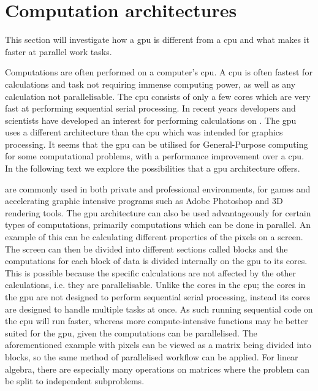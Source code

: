 \section{Computation architectures}
\label{sec:comparch}
This section will investigate how a \acrshort{gpu} is different from a \acrshort{cpu} and what makes it faster at parallel work tasks.

Computations are often performed on a computer's  \acrshort{cpu}.
A \acrshort{cpu} is often fastest for calculations and task not requiring immense computing power, as well as any calculation not parallelisable.
The \acrshort{cpu} consists of only a few cores which are very fast at performing sequential serial processing. \citep{whatisgpu} 
In recent years developers and scientists have developed an interest for performing calculations on  . \citep{gpurise}
The \acrshort{gpu} uses a different architecture than the \acrshort{cpu} which was intended for graphics processing. 
It seems that the \acrshort{gpu} can be utilised for General-Purpose computing for some computational problems, with a performance improvement over a \acrshort{cpu}.
In the following text we explore the possibilities that a \acrshort{gpu} architecture offers.

 are commonly used in both private and professional environments, for games and accelerating graphic intensive programs such as Adobe Photoshop and 3D rendering tools. \citep{NVIDIAADOBE,STEAMHW}
The \acrshort{gpu} architecture can also be used advantageously for certain types of computations, primarily computations which can be done in parallel. 
An example of this can be calculating different properties of the pixels on a screen. 
The screen can then be divided into different sections called blocks and the computations for each block of data is divided internally on the \acrshort{gpu} to its cores. 
This is possible because the specific calculations are not affected by the other calculations, i.e. they are parallelisable.
Unlike the cores in the \acrshort{cpu}; the cores in the \acrshort{gpu} are not designed to perform sequential serial processing, instead its cores are designed to handle multiple tasks at once. 
As such running sequential code on the \acrshort{cpu} will run faster, whereas more compute-intensive functions may be better suited for the \acrshort{gpu}, given the computations can be parallelised. \citep{NvidiaGPGPU}
The aforementioned example with pixels can be viewed as a matrix being divided into blocks, so the same method of parallelised workflow can be applied.
For linear algebra, there are especially many operations on matrices where the problem can be split to independent subproblems.

